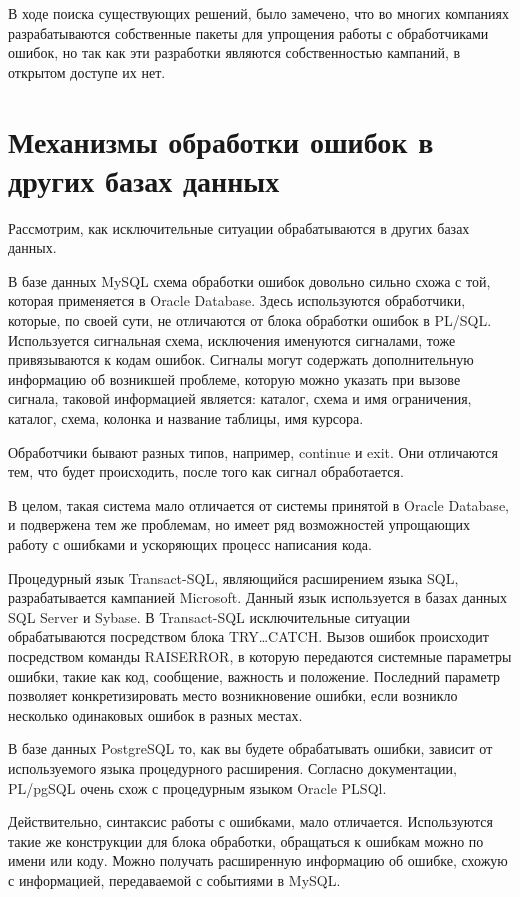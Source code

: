 В ходе поиска существующих решений, было замечено, что во многих компаниях разрабатываются собственные пакеты для упрощения работы с обработчиками ошибок, но так как эти разработки являются собственностью кампаний, в открытом доступе их нет. 


\section{Механизмы обработки ошибок в других базах данных}\label{ch2:sec3}

Рассмотрим, как исключительные ситуации обрабатываются в других базах данных. 

В базе данных MySQL схема обработки ошибок довольно сильно схожа с той, которая применяется в Oracle Database. Здесь используются обработчики, которые, по своей сути, не отличаются от блока обработки ошибок в PL/SQL. Используется сигнальная схема, исключения именуются сигналами, тоже привязываются к кодам ошибок. Сигналы могут содержать дополнительную информацию об возникшей проблеме, которую можно указать при вызове сигнала, таковой информацией является: каталог, схема и имя ограничения, каталог, схема, колонка и название таблицы, имя курсора. 

Обработчики бывают разных типов, например, continue и exit. Они отличаются тем, что будет происходить, после того как сигнал обработается. 

В целом, такая система мало отличается от системы принятой в Oracle Database, и подвержена тем же проблемам, но имеет ряд возможностей упрощающих работу с ошибками и ускоряющих процесс написания кода\cite{MySqlDocumentation}.

Процедурный язык Transact-SQL, являющийся расширением языка SQL, разрабатывается кампанией Microsoft. Данный язык используется в базах данных SQL Server и Sybase.
В Transact-SQL исключительные ситуации обрабатываются посредством блока TRY…CATCH. Вызов ошибок происходит посредством команды RAISERROR, в которую передаются системные параметры ошибки, такие как код, сообщение, важность и положение.  Последний параметр позволяет конкретизировать место возникновение ошибки, если возникло несколько одинаковых ошибок в разных местах\cite{TSQLDocumentation}.

В базе данных PostgreSQL то, как вы будете обрабатывать ошибки, зависит от используемого языка процедурного расширения. Согласно документации, PL/pgSQL очень схож с процедурным языком Oracle PLSQl\cite{PostgreSqlDocumentation}.

Действительно, синтаксис работы с ошибками, мало отличается. Используются такие же конструкции для блока обработки, обращаться к ошибкам можно по имени или коду. Можно получать расширенную информацию об ошибке, схожую с информацией, передаваемой с событиями в MySQL. 

